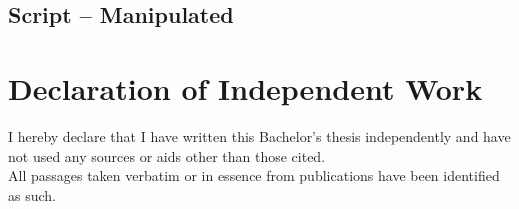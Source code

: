 \documentclass[twoside, 11pt]{article}
\begin{document}
\begin{appendices}
    \subsection{Script -- Manipulated} \label{sec:script-manipulated}
     \vp
     \vp
     \vp
     \vp
     \vp
     \vp
    
\end{appendices}

\vp


\section*{Declaration of Independent Work}

I hereby declare that I have written this Bachelor's thesis independently and have not used any sources or aids other than those cited. \\

\noindent All passages taken verbatim or in essence from publications have been identified as such. \\
\end{document}

